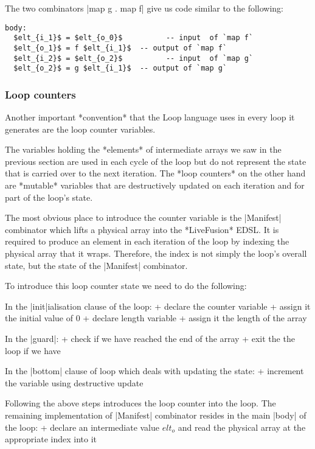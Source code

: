 The two combinators |map g . map f| give us code similar to the following:

\begin{lstlisting}[mathescape]
body:
  $elt_{i_1}$ = $elt_{o_0}$          -- input  of `map f`
  $elt_{o_1}$ = f $elt_{i_1}$  -- output of `map f`
  $elt_{i_2}$ = $elt_{o_2}$          -- input  of `map g`
  $elt_{o_2}$ = g $elt_{i_1}$  -- output of `map g`
\end{lstlisting}

\subsubsection{Loop counters}

Another important *convention* that the Loop language uses in every loop it generates are the loop counter variables.

The variables holding the *elements* of intermediate arrays we saw in the previous section are used in each cycle of the loop but do not represent the state that is carried over to the next iteration. The *loop counters* on the other hand are *mutable* variables that are destructively updated on each iteration and for part of the loop's state.

The most obvious place to introduce the counter variable is the |Manifest| combinator which lifts a physical array into the *LiveFusion* EDSL. It is required to produce an element in each iteration of the loop by indexing the physical array that it wraps. Therefore, the index is not simply the loop's overall state, but the state of the |Manifest| combinator.

To introduce this loop counter state we need to do the following:

In the |init|ialisation clause of the loop:
+ declare the counter variable
+ assign it the initial value of 0
+ declare length variable
+ assign it the length of the array

In the |guard|:
+ check if we have reached the end of the array
+ exit the the loop if we have

In the |bottom| clause of loop which deals with updating the state:
+ increment the variable using destructive update

Following the above steps introduces the loop counter into the loop. The remaining implementation of |Manifest| combinator resides in the main |body| of the loop:
+ declare an intermediate value $elt_o$ and read the physical array at the appropriate index into it

